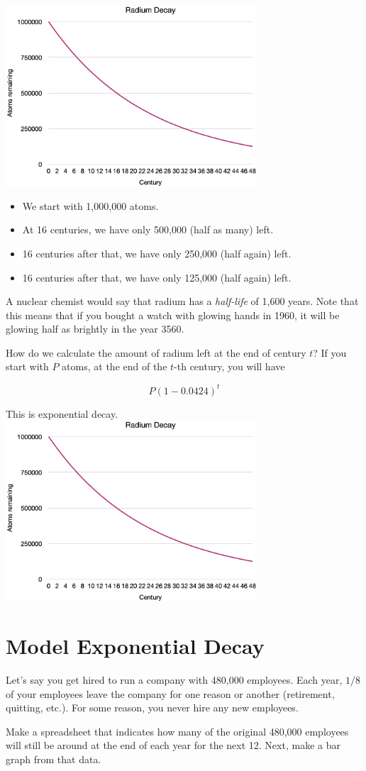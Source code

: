 \includegraphics[width=0.7\textwidth]{radium_decay.png}
 
\begin{itemize}
\item We start with 1,000,000 atoms.
\item At 16 centuries, we have only 500,000 (half as many) left.
\item 16 centuries after that, we have only 250,000 (half again) left.
\item 16 centuries after that, we have only 125,000 (half again) left.
\end{itemize}

A nuclear chemist would say that radium has a \textit{half-life} of
1,600 years. Note that this means that if you bought a watch with
glowing hands in 1960, it will be glowing half as brightly in the year
3560.

How do we calculate the amount of radium left at the end of century
$t$? If you start with $P$ atoms, at the end of the $t$-th century, you
will have

$$P\left(1 - 0.0424\right)^t$$

This is exponential decay.
\includegraphics[width=0.7\textwidth]{radium_decay.png}

\section{Model Exponential Decay}

Let's say you get hired to run a company with 480,000
employees. Each year, $1/8$ of your employees leave the company for
one reason or another (retirement, quitting, etc.). For some reason, you never
hire any new employees.

Make a spreadsheet that indicates how many of the original 480,000
employees will still be around at the end of each year for the next 12. Next, make a
bar graph from that data.
